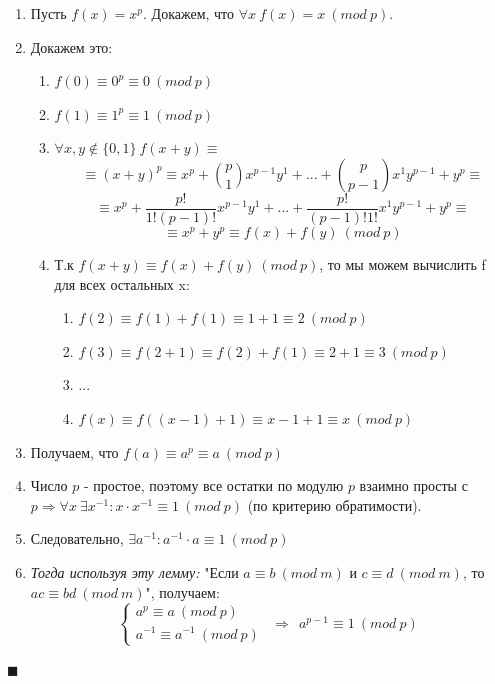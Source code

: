 \documentclass[a4paper, 12pt]{article}
\begin{document}
\begin{enumerate}
    \item Пусть $f(x) = x^{p}$. Докажем, что $\forall x\ f(x) = x\ (mod\ p)$.
    \item Докажем это: 
    \begin{enumerate}
        \item $f(0) \equiv 0^{p} \equiv 0\ (mod\ p)$
        \item $f(1) \equiv 1^{p} \equiv 1\ (mod\ p)$
        \item $\forall x, y \notin \{0, 1\}\ f(x + y) \equiv$ \[
            \equiv (x + y)^{p} \equiv
            x^{p} + {p \choose 1} x^{p-1}y^{1} + ... + {p \choose p - 1} x^{1}y^{p-1} + y^{p} \equiv
        \]
        \[
            \equiv x^{p} + \frac{p!}{1!(p-1)!}x^{p-1}y^{1} + ... + \frac{p!}{(p-1)!1!}x^{1}y^{p-1} + y^{p} \equiv
        \]
        \[
            \equiv x^{p} + y^{p} \equiv f(x) + f(y)\ (mod\ p)
        \]
        \item Т.к $f(x + y) \equiv f(x) + f(y)\ (mod\ p)$, то мы можем вычислить f для всех остальных x:
        \begin{enumerate}
            \item $f(2) \equiv f(1) + f(1) \equiv 1 + 1 \equiv 2\ (mod\ p)$
            \item $f(3) \equiv f(2 + 1) \equiv f(2) + f(1) \equiv 2 + 1 \equiv 3\ (mod\ p)$
            \item ...
            \item $f(x) \equiv f((x - 1) + 1) \equiv x - 1 + 1 \equiv x\ (mod\ p)$
        \end{enumerate}
    \end{enumerate}
    
    \item Получаем, что $f(a) \equiv a^{p} \equiv a\ (mod\ p)$
    \item Число $p$ - простое, поэтому все остатки по модулю $p$ взаимно просты с $p \Rightarrow \forall x\ \exists x^{-1}: x \cdot x^{-1} \equiv 1\ (mod\ p)$ (по критерию обратимости).
    
    \item Следовательно, $\exists a^{-1}: a^{-1} \cdot a \equiv 1\ (mod\ p)$
    
    \item \textit{Тогда используя эту лемму:} "Если $a \equiv b\ (mod\ m)$ и $c \equiv d\ (mod\ m)$, то $ac \equiv bd\ (mod\ m)$", получаем:
    \begin{equation*}
        \begin{cases}
            a^{p} \equiv a\ (mod\ p) \\
            a^{-1} \equiv a^{-1}\ (mod\ p)
        \end{cases}
        \begin{matrix}
            \Rightarrow\ \ a^{p-1} \equiv 1\ (mod\ p)
        \end{matrix}
    \end{equation*}
    
\end{enumerate}

\noindent
$\blacksquare$
\end{document}
